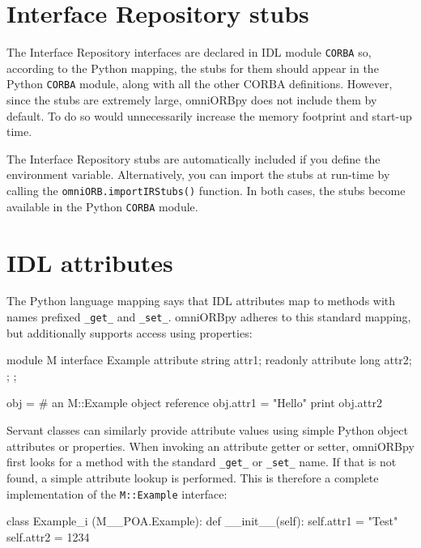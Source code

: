 \documentclass[11pt,oneside,a4paper]{book}
\newcommand{\module}[1]{\texttt{#1}}
\newcommand{\code}[1]{\texttt{#1}}
\newcommand{\op}[1]{\texttt{#1()}}
\begin{document}
\section{Interface Repository stubs}
\label{sec:ifrstubs}

The Interface Repository interfaces are declared in IDL module
\module{CORBA} so, according to the Python mapping, the stubs for them
should appear in the Python \module{CORBA} module, along with all the
other CORBA definitions. However, since the stubs are extremely large,
omniORBpy does not include them by default. To do so would
unnecessarily increase the memory footprint and start-up time.

The Interface Repository stubs are automatically included if you
define the  environment variable.
Alternatively, you can import the stubs at run-time by calling the
\op{omniORB.importIRStubs} function. In both cases, the stubs become
available in the Python \module{CORBA} module.


\section{IDL attributes}
\label{sec:attributes}

The Python language mapping says that IDL attributes map to methods
with names prefixed \code{\_get\_} and \code{\_set\_}. omniORBpy
adheres to this standard mapping, but additionally supports access
using properties:

\begin{idllisting}
module M {
  interface Example {
    attribute string attr1;
    readonly attribute long attr2;
  };
};
\end{idllisting}

\begin{pylisting}
obj = # an M::Example object reference
obj.attr1 = "Hello"
print obj.attr2
\end{pylisting}

Servant classes can similarly provide attribute values using simple
Python object attributes or properties. When invoking an attribute
getter or setter, omniORBpy first looks for a method with the standard
\code{\_get\_} or \code{\_set\_} name. If that is not found, a simple
attribute lookup is performed. This is therefore a complete
implementation of the \code{M::Example} interface:

\begin{pylisting}
class Example_i (M__POA.Example):
    def __init__(self):
        self.attr1 = "Test"
        self.attr2 = 1234
\end{pylisting}
\end{document}
